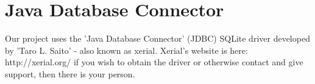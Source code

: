 \section{Java Database Connector}
Our project uses the 'Java Database Connector' (JDBC) SQLite driver developed by
'Taro L. Saito' - also known as xerial.  Xerial's website is here:
http://xerial.org/ \newline
if you wish to obtain the driver or otherwise contact and give support, then
there is your person.